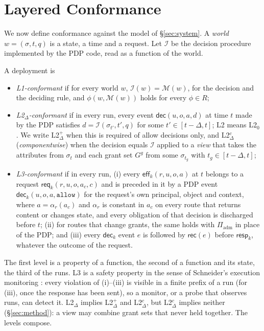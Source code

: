 \documentclass[sigconf,review,anonymous]{acmart}
\newcommand{\allowv}{\mathtt{allow}}
\newcommand{\ev}[1]{\mathsf{#1}}
\begin{document}
\section{Layered Conformance}
\label{sec:levels}

We now define conformance against the model of \S\ref{sec:system}. A \emph{world} $w=(\sigma,t,q)$ is a state, a
time and a request. Let $\mathcal{I}$ be the decision procedure implemented by the PDP code, read as a function
of the world.

\begin{definition}\label{def:levels}
A deployment is
\begin{itemize}
\item \emph{L1-conformant} if for every world $w$, $\mathcal{I}(w)=\mathcal{M}(w)$, for the decision and the
deciding rule, and $\phi(w,\mathcal{M}(w))$ holds for every $\phi\in R$;
\item \emph{L2$_\Delta$-conformant} if in every run, every event $\ev{dec}(u,o,a,d)$ at time $t$ made by the PDP
satisfies $d=\mathcal{I}(\sigma_{t'},t',q)$ for some $t'\in[t-\Delta,t]$; L2 means L2$_0$. We write L2$^+_\Delta$ when
this is required of allow decisions only, and L2$^{c}_\Delta$ (\emph{componentwise}) when the decision equals
$\mathcal{I}$ applied to a \emph{view} that takes the attributes from $\sigma_t$ and each grant set $G^g$ from some
$\sigma_{t_g}$ with $t_g\in[t-\Delta,t]$;
\item \emph{L3-conformant} if in every run, (i) every $\ev{eff}_k(r,u,o,a)$ at $t$ belongs to a request
$\ev{req}_k(r,u,o,a_c,c)$ and is preceded in it by a PDP event $\ev{dec}_k(u,o,a,\allowv)$ for the request's own
principal, object and context, where $a=\alpha_r(a_c)$ and $\alpha_r$ is constant in $a_c$ on every route that
returns content or changes state, and every obligation of that decision is discharged before $t$; (ii) for routes
that change grants, the same holds with $\Pi_{\mathrm{adm}}$ in place of the PDP; and (iii) every $\ev{dec}_k$
event $e$ is followed by $\ev{rec}(e)$ before $\ev{resp}_k$, whatever the outcome of the request.
\end{itemize}
\end{definition}

The first level is a property of a function, the second of a function and its state, the third of the runs.
L3 is a safety property in the sense of Schneider's execution monitoring \cite{schneider2000enforceable}: every
violation of (i)--(iii) is visible in a finite prefix of a run (for (iii), once the response has been sent), so a
monitor, or a probe that observes runs, can detect it.
L2$_\Delta$ implies L2$^+_\Delta$ and L2$^c_\Delta$, but L2$^c_\Delta$ implies neither (\S\ref{sec:method}): a view may
combine grant sets that never held together. The levels compose.
\end{document}
